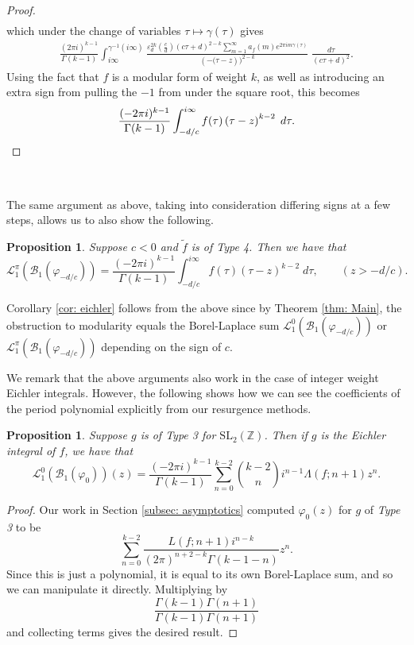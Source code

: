 \documentclass[12pt]{amsart}
\theoremstyle{definition}
\theoremstyle{plain}
\newtheorem{prop}[theorem]{Proposition}
\numberwithin{equation}{section}
\begin{document}
\begin{proof}
\begin{align*}
\end{align*}
which under the change of variables $\tau \mapsto \gamma(\tau)$ gives
\begin{align*}
\frac{(2\pi i)^{k-1}}{\Gamma(k-1)} \int_{i\infty}^{\gamma^{-1}(i\infty)} \frac{\varepsilon_d^{2k} \left( \frac{c}{d}\right) (c\tau +d)^{2-k} \sum_{m=1}^\infty a_f(m) e^{2\pi i m \gamma(\tau)}}{\left(-(\tau - z\right))^{2-k} }\;\frac{d\tau}{(c\tau +d)^2}.
\end{align*}
Using the fact that $f$ is a modular form of weight $k$, as well as introducing an extra sign from pulling the $-1$ from under the square root, this becomes
\[
 \frac{(-2\pi i)^{k-1}}{\Gamma(k-1)} \int_{-d/c}^{i\infty} f(\tau)\left(\tau- z\right)^{k-2}\;d\tau. \qedhere
\]
\end{proof}

\

The same argument as above, taking into consideration differing signs at a few steps, allows us to also show the following.

\begin{prop}
Suppose $c<0$ and $\tilde{f}$ is of Type 4. Then we have that
\[\mathcal{L}^\pi_1(\mathcal{B}_1(\varphi_{-d/c})) =
 \frac{(-2\pi i)^{k-1}}{\Gamma(k-1)} \int_{-d/c}^{i\infty} f(\tau)\left(\tau- z\right)^{k-2}\;d\tau, \quad \quad (z > -d/c).
\] 
\end{prop}

Corollary \ref{cor: eichler} follows from the above since by Theorem \ref{thm: Main}, the obstruction to modularity equals the Borel-Laplace sum $\mathcal{L}^0_1(\mathcal{B}_1(\varphi_{-d/c}))$ or $\mathcal{L}^\pi_1(\mathcal{B}_1(\varphi_{-d/c}))$ depending on the sign of $c$. 

We remark that the above arguments also work in the case of integer weight Eichler integrals. However, the following shows how we can see the coefficients of the period polynomial explicitly from our resurgence methods. 

\begin{prop} \label{prop: polynomial}
	Suppose $g$ is of Type 3 for $\text{SL}_2(\mathbb{Z})$.
	Then if $g$ is the Eichler integral of $f$, we have that
\[\mathcal{L}^0_1(\mathcal{B}_1(\varphi_{0}))(z) = \frac{(-2\pi i)^{k-1}}{\Gamma(k-1)} \sum_{n=0}^{k-2}{k-2\choose n} i^{n-1}\Lambda(f; n+1)z^n. \]
\end{prop}

\begin{proof} Our work in Section \ref{subsec: asymptotics} computed $\varphi_0(z)$ for $g$ of \emph{Type 3} to be 
\[\sum_{n=0}^{k-2}  \frac{L(f; n+1)i^{n-k}}{(2\pi)^{n+2-k}{\Gamma(k-1-n)} } z^n.
\]
Since this is just a polynomial, it is equal to its own Borel-Laplace sum, and so we can manipulate it directly. Multiplying by
\[\frac{\Gamma(k-1)\Gamma(n+1)}{\Gamma(k-1)\Gamma(n+1)}
\]
and collecting terms gives the desired result.  
\end{proof}
\end{document}

